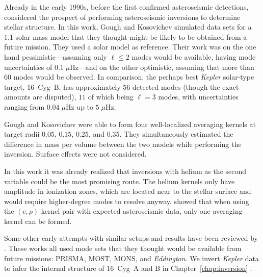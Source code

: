 Already in the early 1990s, before the first confirmed asteroseismic detections, \citet{1993ASPC...40..541G} considered the prospect of performing asteroseismic inversions to determine stellar structure. 
In this work, Gough and Kosovichev simulated data sets for a $1.1$ solar mass model that they thought might be likely to be obtained from a future mission. %
They used a solar model as reference. 
Their work was on the one hand pessimistic---assuming only ${\ell\leq 2}$ modes would be available, having mode uncertainties of ${0.1\;\mu\text{Hz}}$---and on the other optimistic, assuming that more than $60$ modes would be observed. 
In comparison, the perhaps best \emph{Kepler} solar-type target, 16~Cyg~B, has approximately $56$ detected modes (though the exact amounts are disputed), $11$ of which being ${\ell=3}$ modes, with uncertainties ranging from ${0.04\;\mu\text{Hz}}$ up to ${5\;\mu\text{Hz}}$. 

Gough and Kosovichev were able to form four well-localized averaging kernels at target radii $0.05$, $0.15$, $0.25$, and $0.35$. 
They simultaneously estimated the difference in mass per volume between the two models while performing the inversion. 
Surface effects were not considered. 

In this work it was already realized that inversions with helium as the second variable could be the most promising route. 
The helium kernels only have amplitude in ionization zones, which are located near to the stellar surface and would require higher-degree modes to resolve anyway. 
\citet{2001ESASP.464..407B} showed that when using the ${(c,\rho)}$ kernel pair with expected asteroseismic data, only one averaging kernel can be formed. 

Some other early attempts with similar setups and results have been reviewed by \citet{2003Ap&SS.284..153B}. 
These works all used mode sets that they thought would be available from future missions: PRISMA, MOST, MONS, and \emph{Eddington}. %
\lr{Unfortunately, PRISMA, MONS, and \emph{Eddington} were not funded, and MOST did not detect any oscillations in solar-like stars. %
It is only now with the CoRoT and \emph{Kepler} missions that the data are good enough to measure internal stellar structure.} 
We invert \emph{Kepler} data to infer the internal structure of 16~Cyg~A and B in Chapter~\ref{chap:inversion} \citep{2017ApJ...851...80B}. 

